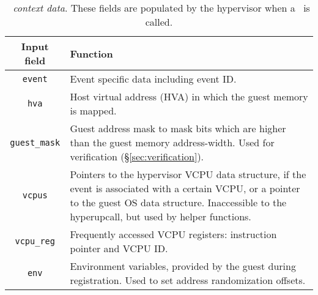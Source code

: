 \documentclass[11pt]{article}
\begin{document}
\begin{table}[t!]
 \centering
 \small
 \begin{tabularx}{\columnwidth}{c|X}
 \textbf{Input field} & \textbf{Function} \\
 \hline
 \texttt{event} & Event specific data including event ID. \\
 \texttt{hva} & Host virtual address (HVA) in which the guest memory is mapped. \\
 \texttt{guest\_mask} & Guest address mask to mask bits which are higher than
	the guest memory address-width. Used for verification (\S\ref{sec:verification}).\\
 \texttt{vcpus} & Pointers to the hypervisor VCPU data structure, if
	the event is associated with a certain VCPU, or a pointer
	to the guest OS data structure. Inaccessible to the
	hyperupcall, but used by helper functions.\\
 \texttt{vcpu\_reg} & Frequently accessed VCPU registers: instruction pointer and VCPU ID. \\
 \texttt{env} & Environment variables, provided by the guest
	during \hypercallback registration. Used to set address randomization offsets. \\
 \end{tabularx}
 \caption{\emph{\Hypercallback~context data}. These fields are populated by the hypervisor when a \hypercallback~is called.}
\label{table:context}
 \end{table}
 
\end{document}
